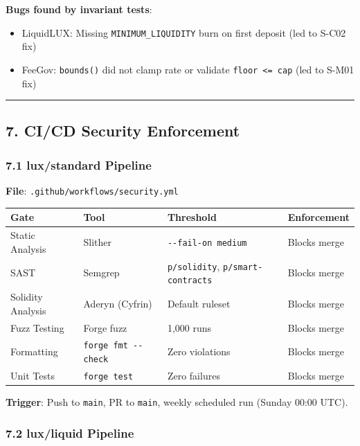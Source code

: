 \documentclass[
]{article}
\newcounter{none} %
\providecommand{\tightlist}{%
  \setlength{\itemsep}{0pt}\setlength{\parskip}{0pt}}
\begin{document}
\textbf{Bugs found by invariant tests}:

\begin{itemize}
\tightlist
\item
  LiquidLUX: Missing \texttt{MINIMUM\_LIQUIDITY} burn on first deposit
  (led to S-C02 fix)
\item
  FeeGov: \texttt{bounds()} did not clamp rate or validate
  \texttt{floor\ \textless{}=\ cap} (led to S-M01 fix)
\end{itemize}

\begin{center}\rule{0.5\linewidth}{0.5pt}\end{center}

\subsection{7. CI/CD Security
Enforcement}\label{7-cicd-security-enforcement}

\subsubsection{7.1 lux/standard Pipeline}\label{71-luxstandard-pipeline}

\textbf{File}: \texttt{.github/workflows/security.yml}

{\def\LTcaptype{none} %
\begin{longtable}[]{@{}llll@{}}
\toprule\noalign{}
Gate & Tool & Threshold & Enforcement \\
\midrule\noalign{}
\endhead
\bottomrule\noalign{}
\endlastfoot
Static Analysis & Slither & \texttt{-\/-fail-on\ medium} & Blocks
merge \\
SAST & Semgrep & \texttt{p/solidity}, \texttt{p/smart-contracts} &
Blocks merge \\
Solidity Analysis & Aderyn (Cyfrin) & Default ruleset & Blocks merge \\
Fuzz Testing & Forge fuzz & 1,000 runs & Blocks merge \\
Formatting & \texttt{forge\ fmt\ -\/-check} & Zero violations & Blocks
merge \\
Unit Tests & \texttt{forge\ test} & Zero failures & Blocks merge \\
\end{longtable}
}

\textbf{Trigger}: Push to \texttt{main}, PR to \texttt{main}, weekly
scheduled run (Sunday 00:00 UTC).

\subsubsection{7.2 lux/liquid Pipeline}\label{72-luxliquid-pipeline}
\end{document}
